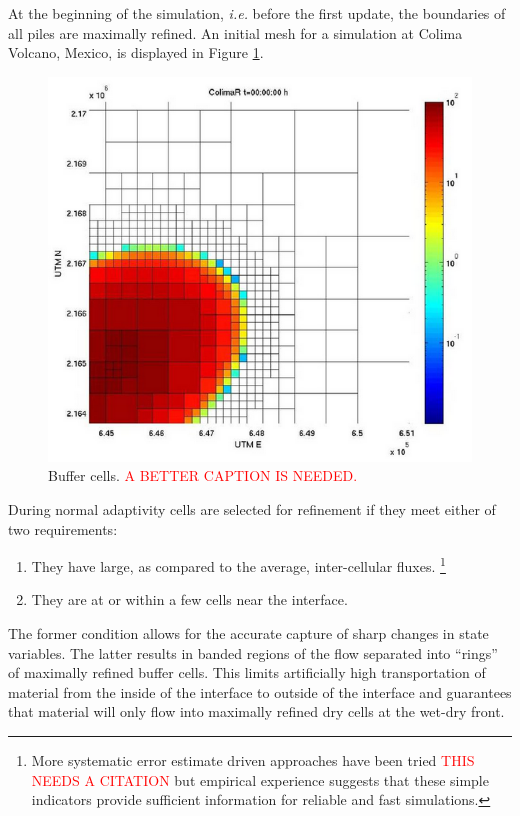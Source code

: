 \documentclass[letterpaper,10pt]{article}
\begin{document}
At the beginning of the simulation, \textit{i.e.} before the first update, the 
boundaries of all piles are maximally refined. An initial mesh for a 
simulation at Colima Volcano, Mexico, is displayed in Figure \ref{bufcell}. 

\begin{figure}[!h]
	\begin{center}
		\includegraphics[scale=.3]{IMAGES/buffercells.png}
		\caption{Buffer cells. \textcolor{red}{A BETTER CAPTION IS NEEDED.}}
		\label{bufcell}
	\end{center}
\end{figure} 

During normal adaptivity cells are selected for refinement if they meet 
either of two requirements:
\begin{enumerate} 
	\item They have large, as compared to the average, inter-cellular fluxes. \footnote{More systematic error estimate driven approaches have been tried \textcolor{red}{THIS NEEDS A CITATION}\cite{} but 
	empirical experience suggests that these simple indicators provide sufficient information for reliable and fast simulations.}
	\item They are at or within a few cells near the interface.
\end{enumerate}
The former condition allows for the accurate capture of sharp changes in state variables. The latter results in banded regions of the flow separated into ``rings'' of maximally refined buffer cells.  
This limits artificially high transportation of material from the inside of the interface to outside of the interface and guarantees that material will only flow into maximally refined dry 
cells at the wet-dry front.
\end{document}
